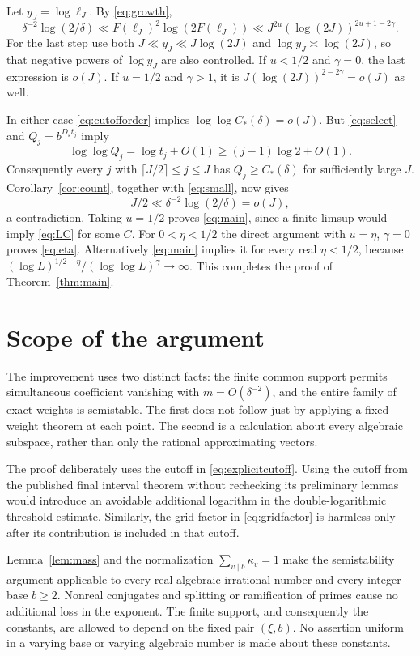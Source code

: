 \documentclass[11pt]{article}
\numberwithin{equation}{section}
\theoremstyle{remark}\newtheorem{remark}[theorem]{Remark}
\newcommand{\eps}{\varepsilon}\newcommand{\LL}{\mathcal L}
\begin{document}
Let $y_J=\log\ell_J$. By \eqref{eq:growth},
\begin{equation}\label{eq:budget}
 \delta^{-2}\log(2/\delta)
 \ll F(\ell_J)^2\log(2F(\ell_J))
 \ll J^{2u}(\log(2J))^{2u+1-2\gamma}.
\end{equation}
For the last step use both $J\ll y_J\ll J\log(2J)$ and
$\log y_J\asymp\log(2J)$, so that negative powers of $\log y_J$ are
also controlled.
If $u<1/2$ and $\gamma=0$, the last expression is $o(J)$.
If $u=1/2$ and $\gamma>1$, it is
$J(\log(2J))^{2-2\gamma}=o(J)$ as well.

In either case \eqref{eq:cutofforder} implies
$\log\log C_*(\delta)=o(J)$.
But \eqref{eq:select} and $Q_j=b^{D_\eps t_j}$ imply
\[
 \log\log Q_j=\log t_j+O(1)\ge(j-1)\log2+O(1).
\]
Consequently every $j$ with $\lceil J/2\rceil\le j\le J$ has
$Q_j\ge C_*(\delta)$ for sufficiently large $J$.
Corollary~\ref{cor:count}, together with \eqref{eq:small}, now gives
\[
 J/2\ll\delta^{-2}\log(2/\delta)=o(J),
\]
a contradiction. Taking $u=1/2$ proves \eqref{eq:main}, since a finite
limsup would imply \eqref{eq:LC} for some $C$.
For $0<\eta<1/2$ the direct argument with $u=\eta$, $\gamma=0$ proves
\eqref{eq:eta}. Alternatively \eqref{eq:main} implies it for every
real $\eta<1/2$, because
$(\log L)^{1/2-\eta}/(\log\log L)^\gamma\to\infty$.
This completes the proof of Theorem~\ref{thm:main}.

\section{Scope of the argument}
The improvement uses two distinct facts: the finite common support
permits simultaneous coefficient vanishing with $m=O(\delta^{-2})$,
and the entire family of exact weights is semistable. The first does
not follow just by applying a fixed-weight theorem at each point.
The second is a calculation about every algebraic subspace, rather
than only the rational approximating vectors.

The proof deliberately uses the cutoff in \eqref{eq:explicitcutoff}.
Using the cutoff from the published final interval theorem without
rechecking its preliminary lemmas would introduce an avoidable
additional logarithm in the double-logarithmic threshold estimate.
Similarly, the grid factor in \eqref{eq:gridfactor} is harmless only
after its contribution is included in that cutoff.

Lemma~\ref{lem:mass} and the normalization
$\sum_{v\mid b}\kappa_v=1$ make the semistability argument applicable
to every real algebraic irrational number and every integer base $b\ge2$.
Nonreal conjugates and splitting or ramification of primes cause no
additional loss in the exponent. The finite support, and consequently
the constants, are allowed to depend on the fixed pair $(\xi,b)$.
No assertion uniform in a varying base or varying algebraic number is
made about these constants.
\end{document}
